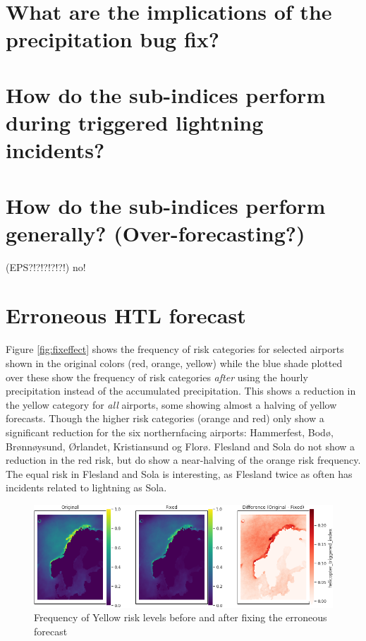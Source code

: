 \section{What are the implications of the precipitation bug fix?}

\section{How do the sub-indices perform during triggered lightning incidents?}

\section{How do the sub-indices perform generally? (Over-forecasting?)}

(EPS?!?!?!?!?!) no!

\section{Erroneous HTL forecast}

Figure \ref{fig:fixeffect} shows the frequency of risk categories for selected airports shown in the original colors (red, orange, yellow) while the blue shade plotted over these show the frequency of risk categories \textit{after} using the hourly precipitation instead of the accumulated precipitation. This shows a reduction in the yellow category for \textit{all} airports, some showing almost a halving of yellow forecasts. Though the higher risk categories (orange and red) only show a significant reduction for the six northernfacing airports: Hammerfest, Bodø, Brønnøysund, Ørlandet, Kristiansund og Florø. Flesland and Sola do not show a reduction in the red risk, but do show a near-halving of the orange risk frequency. The equal risk in Flesland and Sola is interesting, as Flesland twice as often has incidents related to lightning as Sola.

\begin{figure}
    \centering
    \includegraphics[width=\textwidth]{Figures/climatologyyellow.png}
    \caption{Frequency of Yellow risk levels before and after fixing the erroneous forecast}
    \label{fig:fixred}
\end{figure}

